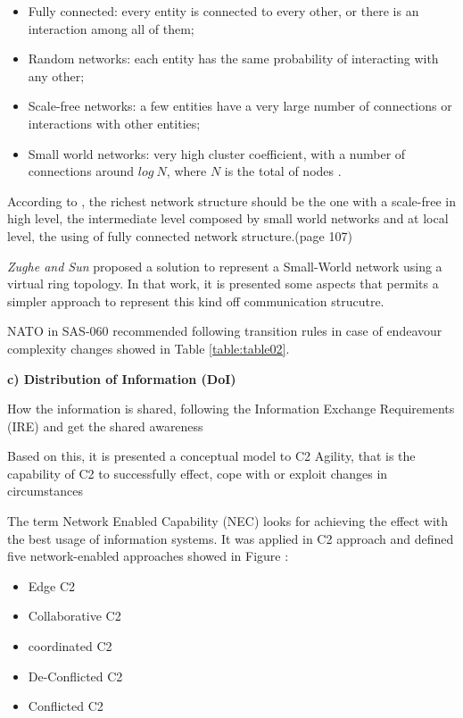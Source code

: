 \begin{itemize}
    \item Fully connected: every entity is connected to every other, or there is an interaction among all of them;
    \item Random networks: each entity has the same probability of interacting with any other;
    \item Scale-free networks: a few entities have a very large number of connections or interactions with other entities;
    \item Small world networks: very high cluster coefficient, with a number of connections around $log~N$, where $N$ is the total of nodes \cite{small01}.
\end{itemize}

According to \cite{Alberts2006}, the richest network structure should be the one with a scale-free in high level, the intermediate level composed by small world networks and at local level, the using of fully connected network structure.(page 107)

\textit{Zughe and Sun} \cite{small02} proposed a solution to represent a Small-World network using a virtual ring topology. In that work, it is presented some aspects that permits a simpler approach to represent this kind off communication strucutre.

NATO in SAS-060 \cite{nato01} recommended following transition rules in case of endeavour complexity  changes showed in Table \ref{table:table02}.





\textbf{c) Distribution of Information (DoI)}

How the information is shared, following the Information Exchange Requirements (IRE) and get the shared awareness


Based on this, it is presented a conceptual model to C2 Agility, that is the capability of C2 to successfully effect, cope with or exploit changes in circumstances \cite{ABAR201713} 

The term Network Enabled Capability (NEC) looks for achieving the effect with the best usage of information systems. It was applied in C2 approach and defined five network-enabled approaches showed in Figure : 

\begin{itemize}
    \item Edge C2
    \item Collaborative C2
    \item coordinated C2
    \item De-Conflicted C2
    \item Conflicted C2
\end{itemize}

